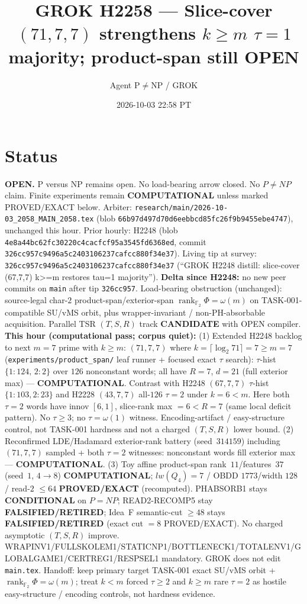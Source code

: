 \documentclass[11pt]{article}
\title{GROK H2258 --- Slice-cover $(71,7,7)$ strengthens $k{\ge}m$ $\tau{=}1$ majority; product-span still OPEN}
\author{Agent P$\neq$NP / GROK}
\date{2026-10-03 22:58 PT}
\begin{document}
\maketitle

\section*{Status}
\textbf{OPEN.} P versus NP remains open. No load-bearing arrow closed. No $P\neq NP$ claim.
Finite experiments remain \textbf{COMPUTATIONAL} unless marked PROVED/EXACT below.
Arbiter: \texttt{research/main/2026-10-03\_2058\_MAIN\_2058.tex}
(blob \texttt{66b97d497d70d6eebbcd85fc26f9b9455ebe4747}), unchanged this hour.
Prior hourly: H2248 (blob \texttt{4e8a44bc62fc30220c4cacfcf95a3545fd6368ed}, commit \texttt{326cc957c9496a5c2403106237cafcc880f34e37}).
Living tip at survey: \texttt{326cc957c9496a5c2403106237cafcc880f34e37}
(``GROK H2248 distill: slice-cover (67,7,7) k>=m restores tau=1 majority'').
\textbf{Delta since H2248:} no new peer commits on \texttt{main} after tip \texttt{326cc957}.
Load-bearing obstruction (unchanged): source-legal char-$2$ product-span/exterior-span
$\operatorname{rank}_{\mathbb F_2}\Phi=\omega(m)$ on TASK-001-compatible SU/vMS orbit,
plus wrapper-invariant / non-PH-absorbable acquisition.
Parallel TSR $(T,S,R)$ track \textbf{CANDIDATE} with OPEN compiler.
\textbf{This hour (computational pass; corpus quiet):}
(1) Extended H2248 backlog to next $m{=}7$ prime with $k{\ge}m$:
$(71,7,7)$ where $k=\lceil\log_2 71\rceil=7{\ge}m{=}7$
(\texttt{experiments/product\_span/} leaf runner + focused exact $\tau$ search):
$\tau$-hist $\{1{:}124,\,2{:}2\}$ over $126$ nonconstant words;
all have $R{=}7$, $d{=}21$ (full exterior max) --- \textbf{COMPUTATIONAL}.
Contrast with H2248 $(67,7,7)$ $\tau$-hist $\{1{:}103,2{:}23\}$ and H2228 $(43,7,7)$
all-$126$ $\tau{=}2$ under $k{=}6{<}m$.
Here both $\tau{=}2$ words have innov $[6,1]$, slice-rank max $=6{<}R{=}7$
(same local deficit pattern). No $\tau{\ge}3$; no $\tau=\omega(1)$ witness.
Encoding-artifact / easy-structure control, not TASK-001 hardness and not a charged $(T,S,R)$ lower bound.
(2) Reconfirmed LDE/Hadamard exterior-rank battery (seed~$314159$) including
$(71,7,7)$ sampled + both $\tau{=}2$ witnesses: nonconstant words fill
exterior max --- \textbf{COMPUTATIONAL}.
(3) Toy affine product-span rank~$11$/features~$37$ (seed~$1$, $4\to8$)
\textbf{COMPUTATIONAL}; $lw(Q_4)=7$ / OBDD $1773$/width $128$ / read-$2$ $\le64$
\textbf{PROVED/EXACT} (recomputed).
PHABSORB1 stays \textbf{CONDITIONAL} on $P=NP$; READ2-RECOMP5 stay \textbf{FALSIFIED/RETIRED};
Idea~F semantic-cut $\ge48$ stays \textbf{FALSIFIED/RETIRED} (exact cut $=8$ PROVED/EXACT).
No charged asymptotic $(T,S,R)$ improve.
WRAPINV1/FULLSKOLEM1/STATICNP1/BOTTLENECK1/TOTALENV1/GLOBALGAME1/CERTREG1/RESPSEL1 mandatory.
GROK does not edit \texttt{main.tex}.
Handoff: keep primary target TASK-001 exact SU/vMS orbit + $\operatorname{rank}_{\mathbb F_2}\Phi=\omega(m)$;
treat $k{<}m$ forced $\tau{\ge}2$ and $k{\ge}m$ rare $\tau{=}2$ as hostile easy-structure /
encoding controls, not hardness evidence.
\end{document}
